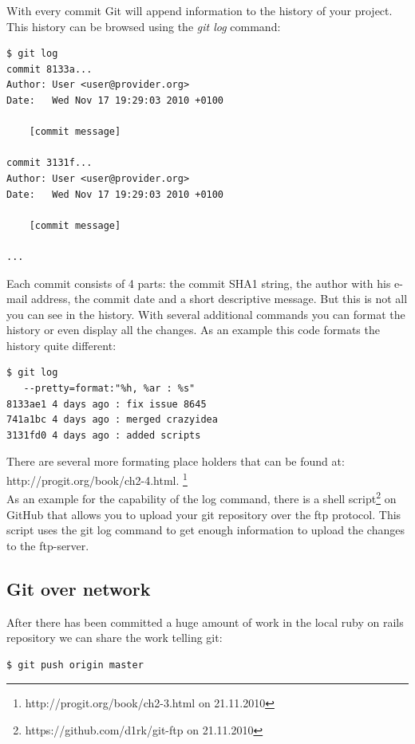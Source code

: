 With every commit Git will append information to the history of your project. This history
can be browsed using the \emph {git log} command:

\begin{lstlisting}
$ git log
commit 8133a...
Author: User <user@provider.org>
Date:   Wed Nov 17 19:29:03 2010 +0100

    [commit message]
    
commit 3131f...
Author: User <user@provider.org>
Date:   Wed Nov 17 19:29:03 2010 +0100

    [commit message]
    
...
\end{lstlisting}

Each commit consists of 4 parts: the commit SHA1 string, the author with his e-mail address, the commit date and a short descriptive message.
But this is not all you can see in the history. With several additional commands you can format the history or even display all the changes.
As an example this code formats the history quite different:

\begin{lstlisting}
$ git log 
   --pretty=format:"%h, %ar : %s"
8133ae1 4 days ago : fix issue 8645
741a1bc 4 days ago : merged crazyidea
3131fd0 4 days ago : added scripts
\end{lstlisting}

There are several more formating place holders that can be found at: http://progit.org/book/ch2-4.html.
\footnote{\cite{gitpro2009} http://progit.org/book/ch2-3.html on 21.11.2010}\\

As an example for the capability of the log command, there is a shell script\footnote{https://github.com/d1rk/git-ftp on 21.11.2010} on GitHub that allows you to upload your git repository over the ftp protocol. This script uses the git log command to get enough information to upload the changes to the ftp-server. 

\subsection{Git over network}

After there has been committed a huge amount of work in the local ruby on rails
repository we can share the work telling git:

\begin{lstlisting}
$ git push origin master 
\end{lstlisting}

